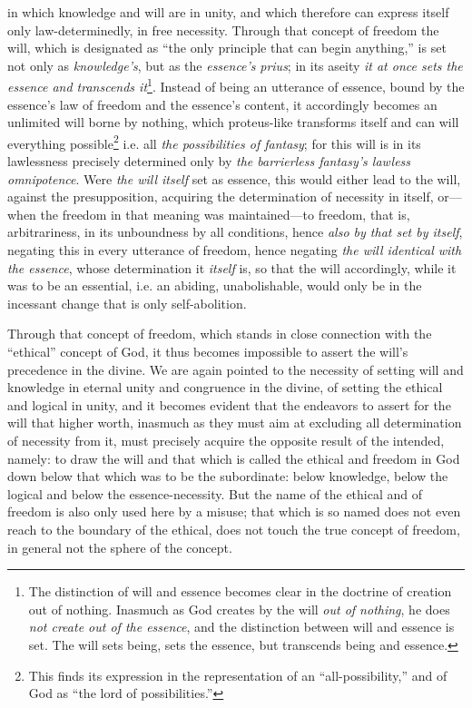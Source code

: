 \documentclass[12pt,a4paper]{book}
\begin{document}
in which knowledge and will are in unity, and which therefore can express itself only
law-determinedly, in free necessity.
Through that concept of freedom the will, which is designated as ``the only principle
that can begin anything,'' is set not only as \emph{knowledge's}, but as the \emph{essence's}
\textit{prius}; in its aseity \emph{it at once sets the essence and transcends
it}\footnote{The distinction of will and essence becomes clear in the doctrine of
creation out of nothing. Inasmuch as God creates by the will \emph{out of nothing}, he does
\emph{not create out of the essence}, and the distinction between will and essence is set. The
will sets being, sets the essence, but transcends being and essence.}. Instead of being
an utterance of essence, bound by the essence's law of freedom and the essence's
content, it accordingly becomes an unlimited will borne by nothing, which proteus-like
transforms itself and can will everything possible\footnote{This finds its expression in
the representation of an ``all-possibility,'' and of God as ``the lord of
possibilities.''} i.e. all \emph{the possibilities of fantasy}; for this will is in its
lawlessness precisely determined only by \emph{the barrierless fantasy's lawless omnipotence}.
Were \emph{the will itself} set as essence, this would either lead to the will, against the
presupposition, acquiring the determination of necessity in itself, or---when the
freedom in that meaning was maintained---to freedom, that is, arbitrariness, in its
unboundness by all conditions, hence \emph{also by that set by itself}, negating this in every
utterance of freedom, hence negating \emph{the will identical with the essence}, whose
determination it \emph{itself} is, so that the will accordingly, while it was to be an
essential, i.e. an abiding, unabolishable, would only be in the incessant change that is
only self-abolition.

Through that concept of freedom, which stands in close connection with the ``ethical''
concept of God, it thus becomes impossible to assert the will's precedence in the
divine. We are again pointed to the necessity of setting will and knowledge in eternal
unity and congruence in the divine, of setting the ethical and logical in unity, and it
becomes evident that the endeavors to assert for the will that higher worth, inasmuch as
they must aim at excluding all determination of necessity from it, must precisely
acquire the opposite result of the intended, namely: to draw the will and that which is
called the ethical and freedom in God down below that which was to be the subordinate:
below knowledge, below the logical and below the essence-necessity. But the name of the
ethical and of freedom is also only used here by a misuse; that which is so named does
not even reach to the boundary of the ethical, does not touch the true concept of
freedom, in general not the sphere of the concept.
\end{document}
